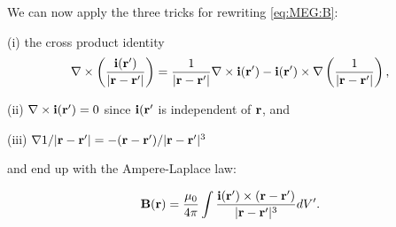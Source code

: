 {We can now apply the three tricks for rewriting \eqref{eq:MEG:B}:

(i) the cross product identity
\begin{equation*}
{\bf \nabla} \times \left(\frac{{\bf i}({\bf r}')}{|{\bf r} - {\bf r}'|}\right) = \frac{1}{|{\bf r} - {\bf r}'|} {\bf \nabla} \times {\bf i}({\bf r}') - {\bf i}({\bf r}') \times {\bf \nabla} \left(\frac{1}{|{\bf r} - {\bf r}'|}\right),
\end{equation*}

(ii) ${\bf \nabla} \times {\bf i}({\bf r}') = 0$ since ${\bf i}({\bf r}'$ is independent of ${\bf r}$, and 

(iii) ${\bf \nabla} 1/|{\bf r} - {\bf r}'| = -({\bf r} - {\bf r}')/|{\bf r} - {\bf r}'|^3$

and end up with the Ampere-Laplace law:

\begin{equation}\label{eq:MEG:ampere-laplace}
{\bf B}({\bf r}) = \frac{\mu_0}{4\pi} \int \frac{ {\bf i}({\bf r}') \times ({\bf r} - {\bf r}')}{|{\bf r} - {\bf r}'|^3} dV'.
\end{equation}
}

